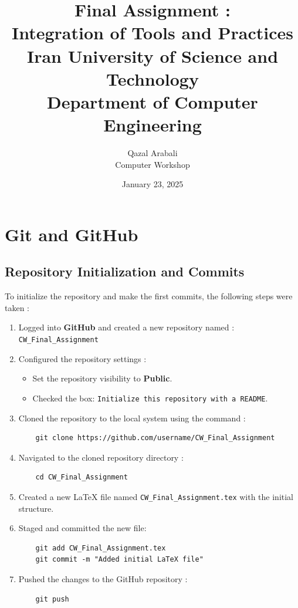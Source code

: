 \documentclass[12pt]{article}
\title{
    \vspace{2in}
    \textbf{Final Assignment :}\\
    \textbf{Integration of Tools and Practices}\\
    \large Iran University of Science and Technology\\
    \large Department of Computer Engineering\\
    \vspace{2in}
}
\author{
    \vspace{0.5in}
    Qazal Arabali\\
    Computer Workshop\\
    \vspace{0.5in}
}
\date{January 23, 2025}
\begin{document}
\begin{titlepage}
    \maketitle
    \thispagestyle{empty}
\end{titlepage}

\newpage

\tableofcontents
\newpage

\section{Git and GitHub}
    \subsection{Repository Initialization and Commits}
    
To initialize the repository and make the first commits, the following steps were taken :

\begin{enumerate}
    \item Logged into \textbf{GitHub} and created a new repository named :
    \texttt{CW\_Final\_Assignment}
    
    \item Configured the repository settings :
    \begin{itemize}
        \item Set the repository visibility to \textbf{Public}.
        \item Checked the box: \texttt{Initialize this repository with a README}.
    \end{itemize}

    \item Cloned the repository to the local system using the command :
    \begin{lstlisting}
    git clone https://github.com/username/CW_Final_Assignment
    \end{lstlisting}

    \item Navigated to the cloned repository directory :
    \begin{lstlisting}
    cd CW_Final_Assignment
    \end{lstlisting}

    \item Created a new LaTeX file named \texttt{CW\_Final\_Assignment.tex} with the initial structure.

    \item Staged and committed the new file:
    \begin{lstlisting}
    git add CW_Final_Assignment.tex
    git commit -m "Added initial LaTeX file"
    \end{lstlisting}

    \item Pushed the changes to the GitHub repository :
    \begin{lstlisting}
    git push
    \end{lstlisting}
\end{enumerate}
\end{document}
